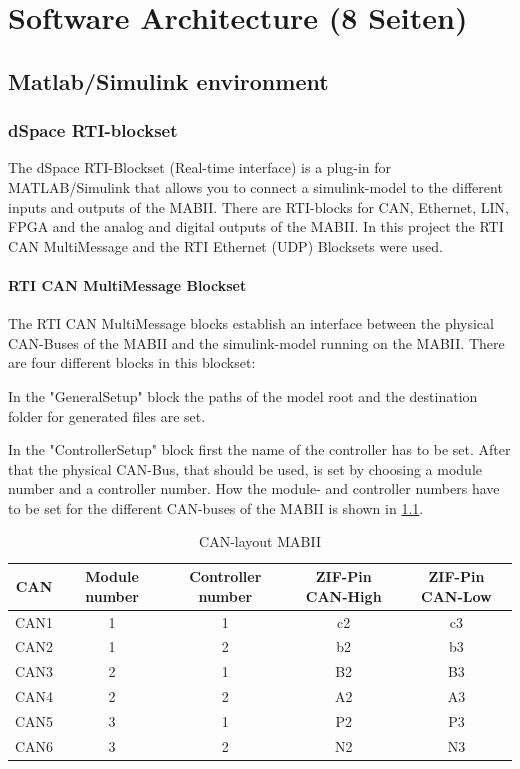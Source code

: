 \documentclass[ExampleMasters.tex]{subfiles}
\begin{document}
\clearpage


\chapter{Software Architecture (8 Seiten)}
\label{chap:software_setup}

         

\section{Matlab/Simulink environment}
\label{sec:matlab}




\subsection{dSpace RTI-blockset}
\label{dSpace_RTI}
The dSpace RTI-Blockset (Real-time interface) is a plug-in for MATLAB/Simulink that allows you to connect a simulink-model to the different inputs and outputs of the MABII. There are RTI-blocks for CAN, Ethernet, LIN, FPGA and the analog and digital outputs of the MABII.
In this project the RTI CAN MultiMessage and the RTI Ethernet (UDP) Blocksets were used.\\ 
\subsubsection{RTI CAN MultiMessage Blockset}
The RTI CAN MultiMessage blocks establish an interface between the physical CAN-Buses of the MABII and the simulink-model running on the MABII. There are four different blocks in this blockset: 

In the "GeneralSetup" block the paths of the model root and the destination folder for generated files are set. 

In the "ControllerSetup" block first the name of the controller has to be set. After that the physical CAN-Bus, that should be used, is set by choosing a module number and a controller number. How the module- and controller numbers have to be set for the different CAN-buses of the MABII is shown in \ref{tab:CAN-layout}.
\begin{table}[h]
	\centering
	\caption{CAN-layout MABII}
	\label{tab:CAN-layout}
	\begin{tabular}{c|c|c|c|c|}
		CAN   & Module number & Controller number & ZIF-Pin CAN-High & ZIF-Pin CAN-Low  \\ \hline
		CAN1     &       1 & 1  & c2 & c3         \\
		CAN2   &      1 & 2  & b2 & b3    \\
		CAN3 &      2 & 1 & B2 & B3        \\
		CAN4& 2 & 2 & A2 & A3  \\
		CAN5& 3 & 1 & P2 & P3 \\
		CAN6& 3 & 2 & N2 & N3 \\
	\end{tabular} \\
\end{table}
\end{document}
